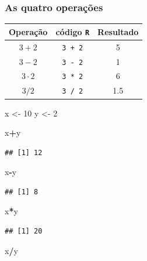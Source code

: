 \documentclass[
]{book}
\newenvironment{Shaded}{\begin{snugshade}}{\end{snugshade}}
\newcommand{\DecValTok}[1]{\textcolor[rgb]{0.00,0.00,0.81}{#1}}
\newcommand{\NormalTok}[1]{#1}
\newcommand{\OperatorTok}[1]{\textcolor[rgb]{0.81,0.36,0.00}{\textbf{#1}}}
\newcommand{\StringTok}[1]{\textcolor[rgb]{0.31,0.60,0.02}{#1}}
\theoremstyle{definition}
\theoremstyle{definition}
\theoremstyle{definition}
\theoremstyle{remark}
\begin{document}
\hypertarget{as-quatro-operauxe7uxf5es}{%
\subsubsection{As quatro operações}\label{as-quatro-operauxe7uxf5es}}

\begin{longtable}[]{@{}ccc@{}}
\toprule
Operação & código \texttt{R} & Resultado\tabularnewline
\midrule
\endhead
\(3 + 2\) & \texttt{3\ +\ 2} & 5\tabularnewline
\(3 - 2\) & \texttt{3\ -\ 2} & 1\tabularnewline
\(3 \cdot2\) & \texttt{3\ *\ 2} & 6\tabularnewline
\(3 / 2\) & \texttt{3\ /\ 2} & 1.5\tabularnewline
\bottomrule
\end{longtable}

\begin{Shaded}
\begin{Highlighting}[]
\NormalTok{x <-}\StringTok{ }\DecValTok{10}
\NormalTok{y <-}\StringTok{ }\DecValTok{2}

\NormalTok{x}\OperatorTok{+}\NormalTok{y}
\end{Highlighting}
\end{Shaded}

\begin{verbatim}
## [1] 12
\end{verbatim}

\begin{Shaded}
\begin{Highlighting}[]
\NormalTok{x}\OperatorTok{-}\NormalTok{y}
\end{Highlighting}
\end{Shaded}

\begin{verbatim}
## [1] 8
\end{verbatim}

\begin{Shaded}
\begin{Highlighting}[]
\NormalTok{x}\OperatorTok{*}\NormalTok{y}
\end{Highlighting}
\end{Shaded}

\begin{verbatim}
## [1] 20
\end{verbatim}

\begin{Shaded}
\begin{Highlighting}[]
\NormalTok{x}\OperatorTok{/}\NormalTok{y}
\end{Highlighting}
\end{Shaded}
\end{document}
